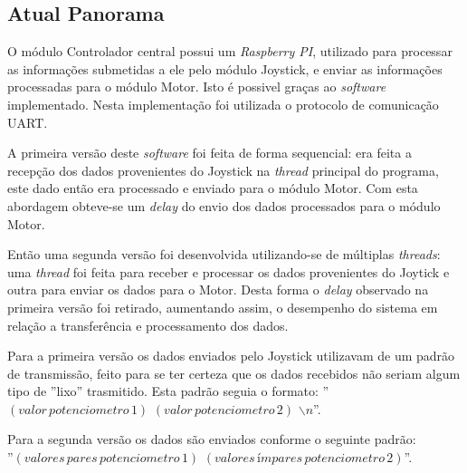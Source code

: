 \subsection{Atual Panorama}

  O módulo Controlador central possui um \textit{Raspberry PI}, utilizado para processar as informações submetidas a ele pelo módulo Joystick, e enviar as informações processadas para o módulo Motor. Isto é possivel graças ao \textit{software} implementado. Nesta implementação foi utilizada o protocolo de comunicação UART.

  A primeira versão deste \textit{software} foi feita de forma sequencial: era feita a recepção dos dados provenientes do Joystick na \textit{thread} principal do programa, este dado então era processado e enviado para o módulo Motor. Com esta abordagem obteve-se um \textit{delay} do envio dos dados processados para o módulo Motor.

  Então uma segunda versão foi desenvolvida utilizando-se de múltiplas \textit{threads}: uma \textit{thread} foi feita para receber e processar os dados provenientes do Joytick e outra para enviar os dados para o Motor. Desta forma o \textit{delay} observado na primeira versão foi retirado, aumentando assim, o desempenho do sistema em relação a transferência e processamento dos dados.

  Para a primeira versão os dados enviados pelo Joystick utilizavam de um padrão de transmissão, feito para se ter certeza que os dados recebidos não seriam algum tipo de ''lixo'' trasmitido. Esta padrão seguia o formato: ''$(valor\, potenciometro\, 1)$ $(valor\, potenciometro\, 2)$ $\backslash n$''.

  Para a segunda versão os dados são enviados conforme o seguinte padrão:\\ ''$(valores\, pares\, potenciometro\, 1)$ $(valores\, ímpares\, potenciometro\, 2)$''.

